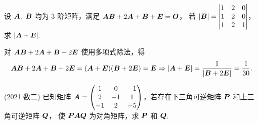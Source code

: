 \begin{example}
    设 $\vb*{A},~\vb*{B}$ 均为 3 阶矩阵，满足 $\vb*{AB}+2\vb*{A}+\vb*{B}+\vb*{E}=\vb*{O}$，
    若 $|\vb*{B}|=\mqty|1&2&0\\1&2&0\\1&2&1|$，求 $|\vb*{A}+\vb*{E}|.$
\end{example}
\begin{solution}
    对 $\vb*{AB}+2\vb*{A}+\vb*{B}+2\vb*{E}$ 使用多项式除法，得 $$\vb*{AB}+2\vb*{A}+\vb*{B}+2\vb*{E}=(\vb*{A}+\vb*{E})(\vb*{B}+2\vb*{E})=\vb*{E}\Rightarrow|\vb*{A}+\vb*{E}|=\dfrac{1}{|\vb*{B}+2\vb*{E}|}=\dfrac{1}{30}.$$
\end{solution}

\begin{example}
    (2021 数二) 已知矩阵 $\vb*{A}=\begin{pmatrix}
            1  & 0  & -1 \\
            2  & -1 & 1  \\
            -1 & 2  & -5
        \end{pmatrix}$，若存在下三角可逆矩阵 $\vb*{P}$ 和上三角可逆矩阵 $\vb*{Q}$，
    使 $\vb*{PAQ}$ 为对角矩阵，求 $\vb*{P}$ 和 $\vb*{Q}$.
\end{example}
